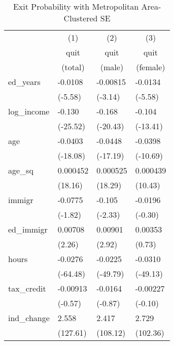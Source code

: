 \tablespacing
\small
\begin{longtable}{p{3 cm} p{2 cm} p{2 cm} p{2 cm}}
\caption{Exit Probability with Metropolitan Area-Clustered SE}
\hline\hline
          &\multicolumn{1}{c}{(1)}&\multicolumn{1}{c}{(2)}&\multicolumn{1}{c}{(3)}\\
          &\multicolumn{1}{c}{quit}&\multicolumn{1}{c}{quit}&\multicolumn{1}{c}{quit}\\
          &\multicolumn{1}{c}{(total)}&\multicolumn{1}{c}{(male)}&\multicolumn{1}{c}{(female)}\\
\hline
ed\_years  &  -0.0108\sym{***}& -0.00815\sym{**} &  -0.0134\sym{***}\\
          &  (-5.58)         &  (-3.14)         &  (-5.58)         \\
log\_income&   -0.130\sym{***}&   -0.168\sym{***}&   -0.104\sym{***}\\
          & (-25.52)         & (-20.43)         & (-13.41)         \\

age       &  -0.0403\sym{***}&  -0.0448\sym{***}&  -0.0398\sym{***}\\
          & (-18.08)         & (-17.19)         & (-10.69)         \\

age\_sq    & 0.000452\sym{***}& 0.000525\sym{***}& 0.000439\sym{***}\\
          &  (18.16)         &  (18.29)         &  (10.43)         \\

immigr    &  -0.0775         &   -0.105\sym{*}  &  -0.0196         \\
          &  (-1.82)         &  (-2.33)         &  (-0.30)         \\
ed\_immigr &  0.00708\sym{*}  &  0.00901\sym{**} &  0.00353         \\
            &   (2.26)         &   (2.92)         &   (0.73)         \\
hours     &  -0.0276\sym{***}&  -0.0225\sym{***}&  -0.0310\sym{***}\\
          & (-64.48)         & (-49.79)         & (-49.13)         \\

tax\_credit& -0.00913         &  -0.0164         & -0.00227         \\
          &  (-0.57)         &  (-0.87)         &  (-0.10)         \\

ind\_change&    2.558\sym{***}&    2.417\sym{***}&    2.729\sym{***}\\
          & (127.61)         & (108.12)         & (102.36)         \\


\end{longtable}
